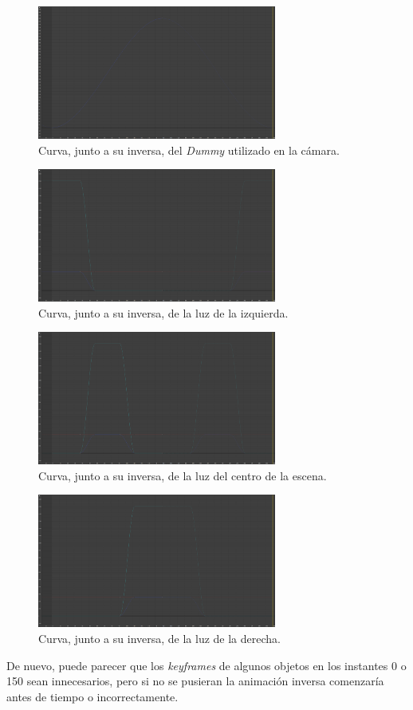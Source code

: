 \begin{figure}[H]
   \centering
   \includegraphics[width=0.7\textwidth]{imagenes/curvas finales/DCamara.png}
   \caption{Curva, junto a su inversa, del \textit{Dummy} utilizado en la cámara.}
\end{figure}

\begin{figure}[H]
   \centering
   \includegraphics[width=0.7\textwidth]{imagenes/curvas finales/LL.png}
   \caption{Curva, junto a su inversa, de la luz de la izquierda.}
\end{figure}

\begin{figure}[H]
   \centering
   \includegraphics[width=0.7\textwidth]{imagenes/curvas finales/LC.png}
   \caption{Curva, junto a su inversa, de la luz del centro de la escena.}
\end{figure}

\begin{figure}[H]
   \centering
   \includegraphics[width=0.7\textwidth]{imagenes/curvas finales/LR.png}
   \caption{Curva, junto a su inversa, de la luz de la derecha.}
\end{figure}

De nuevo, puede parecer que los \textit{keyframes} de algunos objetos en los instantes 0 o 150 sean innecesarios, pero si no se pusieran la animación inversa comenzaría antes de tiempo o incorrectamente.

\newpage